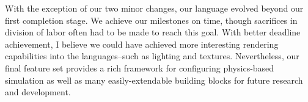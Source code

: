 With the exception of our two minor changes, our language evolved
beyond our first completion stage. We achieve our milestones on time,
though sacrifices in division of labor often had to be made to reach
this goal. With better deadline achievement, I believe we could have
achieved more interesting rendering capabilities into the
languages--such as lighting and textures. Nevertheless, our final
feature set provides a rich framework for configuring physics-based
simulation as well as many easily-extendable building blocks for
future research and development.